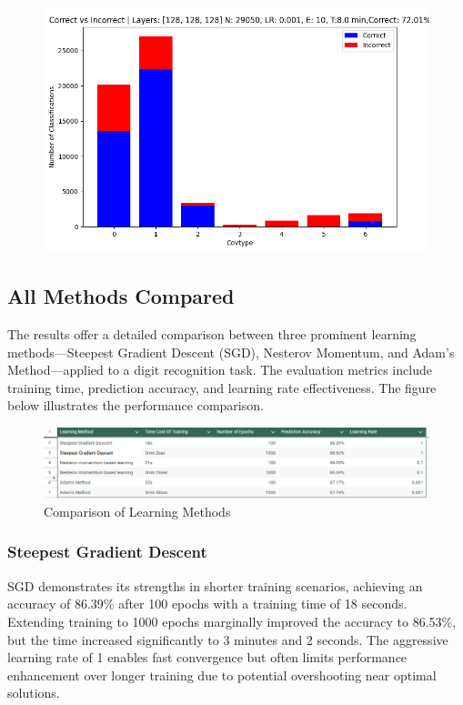 \documentclass{article}
\begin{document}
\begin{figure}
    \centering
    \includegraphics[scale=0.5]{2.png}
\end{figure}
\newpage

\subsection{All Methods Compared}
The results offer a detailed comparison between three prominent learning methods—Steepest Gradient Descent (SGD), Nesterov Momentum, and Adam's Method—applied to a digit recognition task. The evaluation metrics include training time, prediction accuracy, and learning rate effectiveness. The figure below illustrates the performance comparison.

\begin{figure}[h!]
    \centering
    \includegraphics[scale=0.5]{../figs/LearningMethodsCompared.png}
    \caption{Comparison of Learning Methods}
    \label{fig:Comparison}
\end{figure}

\subsubsection{Steepest Gradient Descent}
SGD demonstrates its strengths in shorter training scenarios, achieving an accuracy of 86.39\% after 100 epochs with a training time of 18 seconds. Extending training to 1000 epochs marginally improved the accuracy to 86.53\%, but the time increased significantly to 3 minutes and 2 seconds. The aggressive learning rate of 1 enables fast convergence but often limits performance enhancement over longer training due to potential overshooting near optimal solutions.
\end{document}
